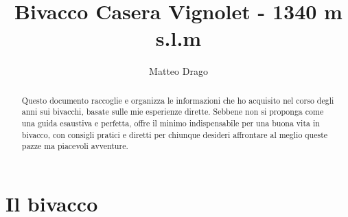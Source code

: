 \documentclass{article}
\title{\textbf{Bivacco Casera Vignolet - 1340 m s.l.m}}
\author{Matteo Drago}
\begin{document}
\maketitle
\thispagestyle{fancy} %

\begin{abstract}
Questo documento raccoglie e organizza le informazioni che ho acquisito nel corso degli anni sui bivacchi, basate sulle mie esperienze dirette. Sebbene non si proponga come una guida esaustiva e perfetta, offre il minimo indispensabile per una buona vita in bivacco, con consigli pratici e diretti per chiunque desideri affrontare al meglio queste pazze ma piacevoli avventure.
\end{abstract}

\section{Il bivacco}
\end{document}
